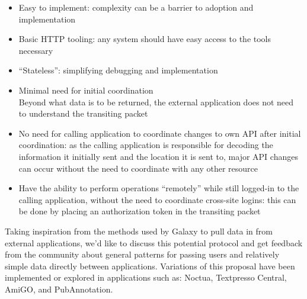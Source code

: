 \documentclass[10pt,oneside]{article}
\begin{document}

\begin{itemize}[noitemsep]
\item Easy to implement: complexity can be a barrier to adoption and
  implementation
\item Basic HTTP tooling: any system should have easy access to
  the tools necessary
\item ``Stateless'': simplifying debugging and implementation
\item Minimal need for initial coordination \\ Beyond what data is to
  be returned, the external application does not need to understand
  the transiting packet
\item No need for calling application to coordinate changes to own API
  after initial coordination: as the calling application is
  responsible for decoding the information it initially sent and the
  location it is sent to, major API changes can occur without the need
  to coordinate with any other resource
\item Have the ability to perform operations ``remotely'' while still
  logged-in to the calling application, without the need to coordinate
  cross-site logins: this can be done by placing an authorization
  token in the transiting packet
\end{itemize}

Taking inspiration from the methods used by Galaxy \citep{Galaxy} to
pull data in from external applications, we'd like to discuss this
potential protocol and get feedback from the community about general
patterns for passing users and relatively simple data directly between
applications. Variations of this proposal have been implemented or
explored in applications such as: Noctua, Textpresso Central, AmiGO,
and PubAnnotation.


\end{document}
